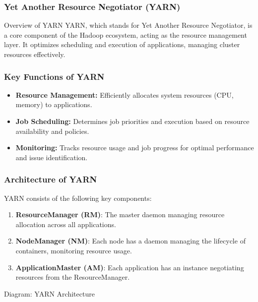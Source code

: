 \documentclass[aspectratio=169]{beamer}
\begin{document}
\begin{frame}[fragile]
    \frametitle{Yet Another Resource Negotiator (YARN)}
    \begin{block}{Overview of YARN}
        YARN, which stands for Yet Another Resource Negotiator, is a core component of the Hadoop ecosystem, acting as the resource management layer.
        It optimizes scheduling and execution of applications, managing cluster resources effectively.
    \end{block}
\end{frame}

\begin{frame}[fragile]
    \frametitle{Key Functions of YARN}
    \begin{itemize}
        \item \textbf{Resource Management:} Efficiently allocates system resources (CPU, memory) to applications.
        \item \textbf{Job Scheduling:} Determines job priorities and execution based on resource availability and policies.
        \item \textbf{Monitoring:} Tracks resource usage and job progress for optimal performance and issue identification.
    \end{itemize}
\end{frame}

\begin{frame}[fragile]
    \frametitle{Architecture of YARN}
    YARN consists of the following key components:
    \begin{enumerate}
        \item \textbf{ResourceManager (RM)}: The master daemon managing resource allocation across all applications.
        \item \textbf{NodeManager (NM)}: Each node has a daemon managing the lifecycle of containers, monitoring resource usage.
        \item \textbf{ApplicationMaster (AM)}: Each application has an instance negotiating resources from the ResourceManager.
    \end{enumerate}
    \begin{block}{Diagram: YARN Architecture}
    \end{block}
\end{frame}
\end{document}
